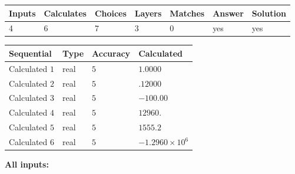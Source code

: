 \documentclass[12pt]{article}
\begin{document}
 
 
\noindent{}
 
 

 
\vspace{0.3in}
   
   
   
   
\noindent\begin{tabular}{|l|l|l|l|l|l|l|}
 \hline
Inputs & Calculates & Choices & Layers & Matches & Answer & Solution \\ \hline
           4 & 
           6 & 
           7
  & 
           3 & 
           0 & 
  yes & 
  yes 
  \\ \hline
 \end{tabular}
   
   
   
   
\noindent{}
   
   
  
  
\noindent\begin{tabular}{|l|l|l|l|}
\hline
 Sequential & Type & Accuracy & Calculated \\ 
\hline
 
 
  Calculated $           1$ & real & $           5 $ & 
 $ 1.0000 $ 
 \\  \hline  
 
 
  Calculated $           2$ & real & $           5 $ & 
 $ .12000 $ 
 \\  \hline  
 
 
  Calculated $           3$ & real & $           5 $ & 
 $ -100.00 $ 
 \\  \hline  
 
 
  Calculated $           4$ & real & $           5 $ & 
 $ 12960. $ 
 \\  \hline  
 
 
  Calculated $           5$ & real & $           5 $ & 
 $ 1555.2 $ 
 \\  \hline  
 
 
  Calculated $           6$ & real & $           5 $ & 
 $ -1.2960 \times 10^{6} $ 
 \\  \hline  
 \end{tabular}
   
   
   
   
\noindent\vspace{0.1in}\hspace{-0.08in} {\textbf{\Large{All inputs: }}}
   
\end{document}

